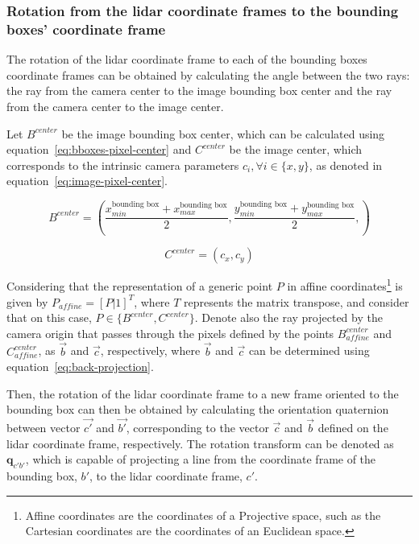 \subsubsection{Rotation from the \ac{lidar} coordinate frames to the bounding boxes' coordinate frame}
The rotation of the \ac{lidar} coordinate frame to each of the bounding boxes coordinate frames can be obtained by calculating the angle between the two rays: the ray from the camera center to the image bounding box center and the ray from the camera center to the image center. 

Let $B^{center}$ be the image bounding box center, which can be calculated using equation~\ref{eq:bboxes-pixel-center} and $C^{center}$ be the image center, which corresponds to the intrinsic camera parameters $c_i, \forall i \in \{x, y\}$, as denoted in equation~\ref{eq:image-pixel-center}.

\begin{equation}
	\label{eq:bboxes-pixel-center}	
B^{center} = \left(\frac{x^{\text{bounding box}}_{min} + x^{\text{bounding box}}_{max}}{2}, \frac{y^{\text{bounding box}}_{min} + y^{\text{bounding box}}_{max}}{2},\right)
\end{equation}

\begin{equation}
\label{eq:image-pixel-center}
C^{center} = (c_x, c_y)
\end{equation}

Considering that the representation of a generic point $P$ in affine coordinates\footnote{Affine coordinates are the coordinates of a Projective space, such as the Cartesian coordinates are the coordinates of an Euclidean space.} is given by $P_{affine} = \left[P | 1\right]^T$, where $T$ represents the matrix transpose, and consider that on this case, $P \in \{B^{center}, C^{center}\}$. Denote also the ray projected by the camera origin that passes through the pixels defined by the points $B^{center}_{affine}$ and $C^{center}_{affine}$, as $\vec{b}$ and $\vec{c}$, respectively, where  $\vec{b}$ and $\vec{c}$ can be determined using equation~\ref{eq:back-projection}.

Then, the rotation of the \ac{lidar} coordinate frame to a new frame oriented to the bounding box can then be obtained by calculating the orientation quaternion between vector $\vec{c'}$ and $\vec{b'}$, corresponding to the vector $\vec{c}$ and $\vec{b}$ defined on the \ac{lidar} coordinate frame, respectively. The rotation transform can be denoted as $\mathbf{q}_{c'b'}$, which is capable of projecting a line from the coordinate frame of the bounding box, $b'$, to the \ac{lidar} coordinate frame, $c'$.

